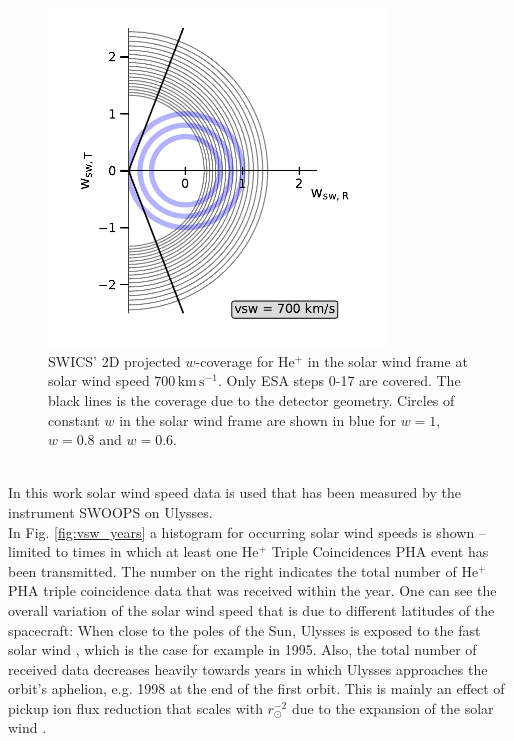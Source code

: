 \begin{figure}[h]
	\includegraphics[width=0.8\textwidth]{Figures/covv.pdf}
	\centering
	\caption{SWICS' 2D projected $w$-coverage for $\mathrm{He^{+}}$ in the solar wind frame at solar wind speed $700\,\mathrm{km\,s^{-1}}$. Only ESA steps 0-17 are covered. The black lines is the coverage due to the detector geometry. Circles of constant $w$ in the solar wind frame are shown in blue for $w = 1$, $w = 0.8$ and $w = 0.6$.}
	\label{fig:cov}
\end{figure}
\\
In this work solar wind speed data is used that has been measured by the instrument SWOOPS \citep[Solar Wind Observations Over the Poles of the Sun,][]{bame_swoops} on Ulysses. \\ 
In Fig. \ref{fig:vsw_years} a histogram for occurring solar wind speeds is shown -- limited to times in which at least one $\mathrm{He^{+}}$ Triple Coincidences PHA event has been transmitted. The number on the right indicates the total number of $\mathrm{He^{+}}$ PHA triple coincidence data that was received within the year. One can see the overall variation of the solar wind speed that is due to different latitudes of the spacecraft: When close to the poles of the Sun, Ulysses is exposed to the fast solar wind \citep{mccomas_2004}, which is the case for example in 1995. Also, the total number of received data decreases heavily towards years in which Ulysses approaches the orbit's aphelion, e.g. 1998 at the end of the first orbit. This is mainly an effect of pickup ion flux reduction that scales with $r_\odot^{-2}$ due to the expansion of the solar wind \citep[][,Ch. 6.1]{prlss_2004}.
